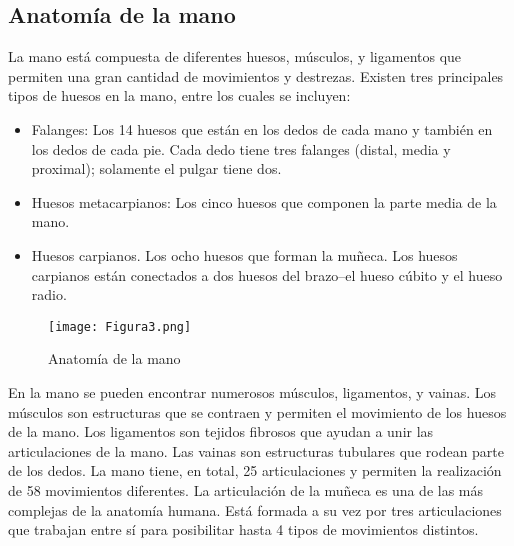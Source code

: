 \documentclass{article}
\begin{document}
\subsection{Anatomía de la mano}

La mano está compuesta de diferentes huesos, músculos, y ligamentos que permiten una gran cantidad de movimientos y destrezas\cite{4}. Existen tres principales tipos de huesos en la mano, entre los cuales se incluyen:

\begin{itemize}
\item Falanges: Los 14 huesos que están en los dedos de cada mano y también en los dedos de cada pie. Cada dedo tiene tres falanges (distal, media y proximal); solamente el pulgar tiene dos.
\item Huesos metacarpianos: Los cinco huesos que componen la parte media de la mano.
\item Huesos carpianos. Los ocho huesos que forman la muñeca. Los huesos carpianos están conectados a dos huesos del brazo--el hueso cúbito y el hueso radio.
\end{itemize}
\begin{figure} [htp]%
    \centering
    \texttt{[image: Figura3.png]} %
    \caption{Anatomía de la mano}
    \label{grafica}
\end{figure}
En la mano se pueden encontrar numerosos músculos, ligamentos, y vainas. Los músculos son estructuras que se contraen y permiten el movimiento de los huesos de la mano. Los ligamentos son tejidos fibrosos que ayudan a unir las articulaciones de la mano. Las vainas son estructuras tubulares que rodean parte de los dedos.
La mano tiene, en total, 25 articulaciones y permiten la realización de 58 movimientos diferentes. La articulación de la muñeca es una de las más complejas de la anatomía humana. Está formada a su vez por tres articulaciones que trabajan entre sí para posibilitar hasta 4 tipos de movimientos distintos.
\end{document}
